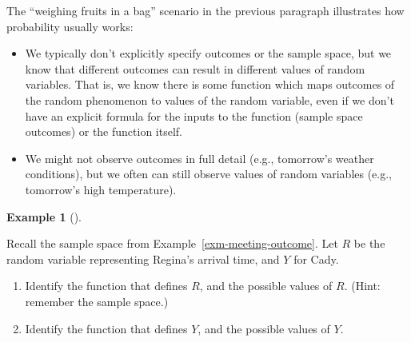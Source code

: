 \documentclass[
  letterpaper,
  DIV=11,
  numbers=noendperiod]{scrreprt}
\providecommand{\tightlist}{%
  \setlength{\itemsep}{0pt}\setlength{\parskip}{0pt}}
\theoremstyle{plain}
\theoremstyle{definition}
\newtheorem{example}{Example}[chapter]
\theoremstyle{definition}
\theoremstyle{definition}
\theoremstyle{remark}
\begin{document}
The ``weighing fruits in a bag'' scenario in the previous paragraph
illustrates how probability usually works:

\begin{itemize}
\tightlist
\item
  We typically don't explicitly specify outcomes or the sample space,
  but we know that different outcomes can result in different values of
  random variables. That is, we know there is some function which maps
  outcomes of the random phenomenon to values of the random variable,
  even if we don't have an explicit formula for the inputs to the
  function (sample space outcomes) or the function itself.
\item
  We might not observe outcomes in full detail (e.g., tomorrow's weather
  conditions), but we often can still observe values of random variables
  (e.g., tomorrow's high temperature).
\end{itemize}

\begin{tcolorbox}[enhanced jigsaw, opacityback=0, left=2mm, colframe=quarto-callout-note-color-frame, toprule=.15mm, breakable, colback=white, leftrule=.75mm, arc=.35mm, rightrule=.15mm, bottomrule=.15mm]

\begin{example}[]\protect\hypertarget{exm-meeting-rv-function}{}\label{exm-meeting-rv-function}

Recall the sample space from Example~\ref{exm-meeting-outcome}. Let
\(R\) be the random variable representing Regina's arrival time, and
\(Y\) for Cady.

\begin{enumerate}
\def\labelenumi{\arabic{enumi}.}
\tightlist
\item
  Identify the function that defines \(R\), and the possible values of
  \(R\). (Hint: remember the sample space.)
\item
  Identify the function that defines \(Y\), and the possible values of
  \(Y\).
\end{enumerate}

\end{example}

\end{tcolorbox}
\end{document}
